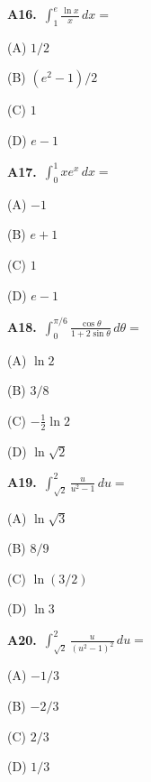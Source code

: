 \documentclass[11pt]{article}
\begin{document}
\bigskip\noindent\textbf{A16.}\ $\int_1^e\frac{\ln x}{x}\,dx=$
\begin{list}{}{\setlength{\leftmargin}{3em}\setlength{\labelwidth}{2.5em}\setlength{\itemsep}{0pt}\setlength{\topsep}{2pt}}
\item[(A)] $1/2$
\item[(B)] $(e^2-1)/2$
\item[(C)] $1$
\item[(D)] $e-1$
\end{list}

\bigskip\noindent\textbf{A17.}\ $\int_0^1xe^x\,dx=$
\begin{list}{}{\setlength{\leftmargin}{3em}\setlength{\labelwidth}{2.5em}\setlength{\itemsep}{0pt}\setlength{\topsep}{2pt}}
\item[(A)] $-1$
\item[(B)] $e+1$
\item[(C)] $1$
\item[(D)] $e-1$
\end{list}

\bigskip\noindent\textbf{A18.}\ $\int_0^{\pi/6}\frac{\cos\theta}{1+2\sin\theta}\,d\theta=$
\begin{list}{}{\setlength{\leftmargin}{3em}\setlength{\labelwidth}{2.5em}\setlength{\itemsep}{0pt}\setlength{\topsep}{2pt}}
\item[(A)] $\ln2$
\item[(B)] $3/8$
\item[(C)] $-\frac12\ln2$
\item[(D)] $\ln\sqrt2$
\end{list}

\bigskip\noindent\textbf{A19.}\ $\int_{\sqrt2}^2\frac{u}{u^2-1}\,du=$
\begin{list}{}{\setlength{\leftmargin}{3em}\setlength{\labelwidth}{2.5em}\setlength{\itemsep}{0pt}\setlength{\topsep}{2pt}}
\item[(A)] $\ln\sqrt3$
\item[(B)] $8/9$
\item[(C)] $\ln(3/2)$
\item[(D)] $\ln3$
\end{list}

\bigskip\noindent\textbf{A20.}\ $\int_{\sqrt2}^2\frac{u}{(u^2-1)^2}\,du=$
\begin{list}{}{\setlength{\leftmargin}{3em}\setlength{\labelwidth}{2.5em}\setlength{\itemsep}{0pt}\setlength{\topsep}{2pt}}
\item[(A)] $-1/3$
\item[(B)] $-2/3$
\item[(C)] $2/3$
\item[(D)] $1/3$
\end{list}
\end{document}
